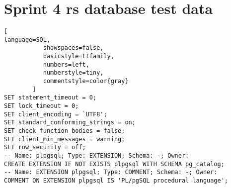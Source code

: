 \chapter{Sprint 4 \gls{rs} database test data}
\label{app:datadump}
\begin{lstlisting}[
language=SQL,
           showspaces=false,
           basicstyle=ttfamily,
           numbers=left,
           numberstyle=tiny,
           commentstyle=color{gray}
        ]
SET statement_timeout = 0;
SET lock_timeout = 0;
SET client_encoding = `UTF8';
SET standard_conforming_strings = on;
SET check_function_bodies = false;
SET client_min_messages = warning;
SET row_security = off;
-- Name: plpgsql; Type: EXTENSION; Schema: -; Owner: 
CREATE EXTENSION IF NOT EXISTS plpgsql WITH SCHEMA pg_catalog;
-- Name: EXTENSION plpgsql; Type: COMMENT; Schema: -; Owner: 
COMMENT ON EXTENSION plpgsql IS 'PL/pgSQL procedural language';


\end{lstlisting}
